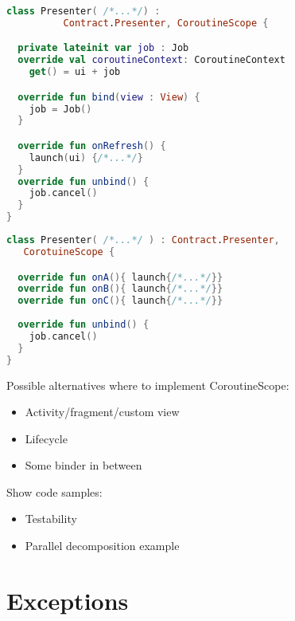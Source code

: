 \documentclass[10pt]{beamer}
\begin{document}
\begin{frame}[fragile]
\begin{lstlisting}[language=Kotlin, basicstyle=\ttfamily]
class Presenter( /*...*/) : 
          Contract.Presenter, CoroutineScope {

  private lateinit var job : Job
  override val coroutineContext: CoroutineContext
    get() = ui + job

  override fun bind(view : View) {
    job = Job()  
  }

  override fun onRefresh() {
    launch(ui) {/*...*/}
  }
  override fun unbind() {
    job.cancel()
  }
}
\end{lstlisting}
\end{frame}
\begin{frame}[fragile]
\begin{lstlisting}[language=Kotlin, basicstyle=\ttfamily]
class Presenter( /*...*/ ) : Contract.Presenter,
   CorotuineScope {

  override fun onA(){ launch{/*...*/}}
  override fun onB(){ launch{/*...*/}}
  override fun onC(){ launch{/*...*/}}
  
  override fun unbind() {
    job.cancel() 
  }
}
\end{lstlisting}
\end{frame}
\begin{frame}[fragile]
Possible alternatives where to implement CoroutineScope:
\begin{itemize}
\item Activity/fragment/custom view 
\item Lifecycle 
\item Some binder in between 
\end{itemize}
\end{frame}

\begin{frame}[fragile]
Show code samples:
\begin{itemize}
\item Testability 
\item Parallel decomposition example 
\end{itemize}
\end{frame}


\section{Exceptions}
\end{document}
